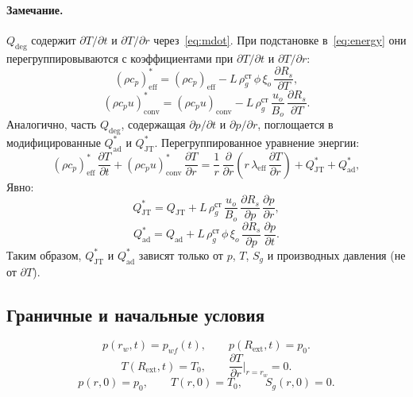 \documentclass[12pt,a4paper]{article}
\newcommand{\pp}{\partial}
\newcommand{\ext}{\mathrm{ext}}
\newcommand{\eff}{\mathrm{eff}}
\newcommand{\st}{\text{ст}}
\begin{document}
\paragraph{Замечание.}
$Q_\mathrm{deg}$ содержит $\pp T/\pp t$ и $\pp T/\pp r$
через~\eqref{eq:mdot}. При подстановке в~\eqref{eq:energy}
они перегруппировываются с коэффициентами при $\pp T/\pp t$
и $\pp T/\pp r$:
\begin{equation}\label{eq:rhocp_eff_mod}
  (\rho c_p)_\eff^* = (\rho c_p)_\eff
    - L\,\rho_g^\st\,\phi\,\xi_o\,\frac{\pp R_s}{\pp T},
\end{equation}
\begin{equation}\label{eq:rhocp_conv_mod}
  (\rho c_p u)_\mathrm{conv}^* = (\rho c_p u)_\mathrm{conv}
    - L\,\rho_g^\st\,\frac{u_o}{B_o}\,\frac{\pp R_s}{\pp T}.
\end{equation}
Аналогично, часть $Q_\mathrm{deg}$, содержащая $\pp p/\pp t$
и $\pp p/\pp r$, поглощается в модифицированные
$Q_\mathrm{ad}^*$ и $Q_\mathrm{JT}^*$.
Перегруппированное уравнение энергии:
\begin{equation}\label{eq:energy_regrouped}
  (\rho c_p)_\eff^*\,\frac{\pp T}{\pp t}
  + (\rho c_p u)_\mathrm{conv}^*\,\frac{\pp T}{\pp r}
  = \frac{1}{r}\,\frac{\pp}{\pp r}\!\left(
      r\,\lambda_\eff\,\frac{\pp T}{\pp r}
    \right)
  + Q_\mathrm{JT}^* + Q_\mathrm{ad}^*,
\end{equation}
Явно:
\begin{equation}\label{eq:QJT_star}
  Q_\mathrm{JT}^*
  = Q_\mathrm{JT}
    + L\,\rho_g^\st\,\frac{u_o}{B_o}\,
      \frac{\pp R_s}{\pp p}\,\frac{\pp p}{\pp r},
\end{equation}
\begin{equation}\label{eq:Qad_star}
  Q_\mathrm{ad}^*
  = Q_\mathrm{ad}
    + L\,\rho_g^\st\,\phi\,\xi_o\,
      \frac{\pp R_s}{\pp p}\,\frac{\pp p}{\pp t}.
\end{equation}
Таким образом, $Q_\mathrm{JT}^*$ и $Q_\mathrm{ad}^*$ зависят
только от $p$, $T$, $S_g$ и производных давления (не от $\pp T$).


\subsection{Граничные и начальные условия}

\begin{equation}\label{eq:bc_p}
  p(r_w, t) = p_{wf}(t), \qquad
  p(R_\ext, t) = p_0.
\end{equation}
\begin{equation}\label{eq:bc_T}
  T(R_\ext, t) = T_0, \qquad
  \frac{\pp T}{\pp r}\bigg|_{r = r_w} = 0.
\end{equation}
\begin{equation}\label{eq:ic}
  p(r, 0) = p_0, \qquad T(r, 0) = T_0, \qquad S_g(r, 0) = 0.
\end{equation}
\end{document}
